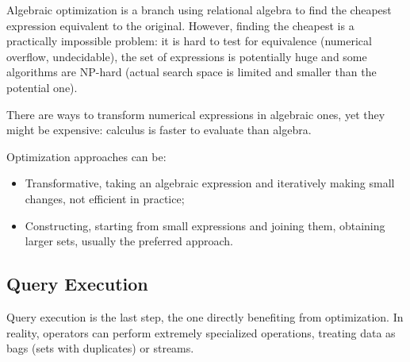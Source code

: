 Algebraic optimization is a branch using relational algebra to find the cheapest expression equivalent to the original. However, finding the cheapest is a practically impossible problem: it is hard to test for equivalence (numerical overflow, undecidable), the set of expressions is potentially huge and some algorithms are NP-hard (actual search space is limited and smaller than the potential one). 

There are ways to transform numerical expressions in algebraic ones, yet they might be expensive: calculus is faster to evaluate than algebra. 

Optimization approaches can be:
\begin{itemize}
	\item Transformative, taking an algebraic expression and iteratively making small changes, not efficient in practice;
	\item Constructing, starting from small expressions and joining them, obtaining larger sets, usually the preferred approach.
\end{itemize}

\subsection{Query Execution}
Query execution is the last step, the one directly benefiting from optimization. In reality, operators can perform extremely specialized operations, treating data as bags (sets with duplicates) or streams.




